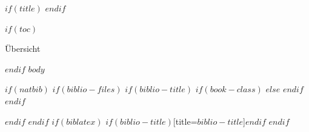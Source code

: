 \documentclass[$if(fontsize)$$fontsize$,$endif$$if(handout)$handout,$endif$$if(beamer)$ignorenonframetext,$endif$]{$documentclass$}
\author{$for(author)$$author.name$$sep$ \and $endfor$}
\date{$if(place)$$place$, $endif$$date$}
\begin{document}
$if(title)$ { \frame{\titlepage} } $endif$

$if(toc)$
\begin{frame}{Übersicht}
\tableofcontents[hideallsubsections]
\end{frame}

$endif$
$body$

$if(natbib)$
$if(biblio-files)$
$if(biblio-title)$
$if(book-class)$
\renewcommand\bibname{$biblio-title$}
$else$
\renewcommand\refname{$biblio-title$}
$endif$
$endif$


$endif$
$endif$
$if(biblatex)$
\printbibliography$if(biblio-title)$[title=$biblio-title$]$endif$
$endif$
\end{document}
